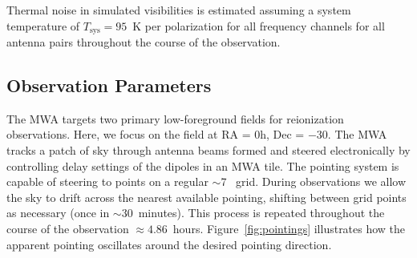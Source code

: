 \documentclass[preprint2,iop,numberedappendix]{emulateapj}
\begin{document}


Thermal noise in simulated visibilities is estimated assuming a system temperature of $T_\textrm{sys}=95$~K per polarization for all frequency channels for all antenna pairs throughout the course of the observation. %

\subsection{Observation Parameters}\label{sec:obsparms}

The MWA targets two primary low-foreground fields for reionization observations. Here, we focus on the field at RA = 0h, Dec = $-30$\arcdeg. The MWA tracks a patch of sky through antenna beams formed and steered electronically by controlling delay settings of the dipoles in an MWA tile. The pointing system is capable of steering to points on a regular $\sim$7\arcdeg~ grid. During observations we allow the sky to drift across the nearest available pointing, shifting between grid points as necessary (once in $\sim 30$~minutes). This process is repeated throughout the course of the observation $\approx 4.86$~hours. Figure~\ref{fig:pointings} illustrates how the apparent pointing oscillates around the desired pointing direction. 
\end{document}

